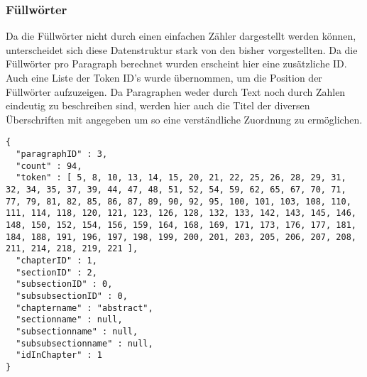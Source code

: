 \subsubsection*{F\"ullw\"orter}
Da die F\"ullw\"orter nicht durch einen einfachen Z\"ahler dargestellt werden k\"onnen, unterscheidet sich diese Datenstruktur stark von den bisher vorgestellten. Da die F\"ullw\"orter pro Paragraph berechnet wurden erscheint hier eine zus\"atzliche ID. Auch eine Liste der Token ID's wurde \"ubernommen, um die Position der F\"ullw\"orter aufzuzeigen. Da Paragraphen weder durch Text noch durch Zahlen eindeutig zu beschreiben sind, werden hier auch die Titel der diversen \"Uberschriften mit angegeben um so eine verst\"andliche Zuordnung zu erm\"oglichen. 
\newpage
\begin{lstlisting}
{
  "paragraphID" : 3,
  "count" : 94,
  "token" : [ 5, 8, 10, 13, 14, 15, 20, 21, 22, 25, 26, 28, 29, 31, 32, 34, 35, 37, 39, 44, 47, 48, 51, 52, 54, 59, 62, 65, 67, 70, 71, 77, 79, 81, 82, 85, 86, 87, 89, 90, 92, 95, 100, 101, 103, 108, 110, 111, 114, 118, 120, 121, 123, 126, 128, 132, 133, 142, 143, 145, 146, 148, 150, 152, 154, 156, 159, 164, 168, 169, 171, 173, 176, 177, 181, 184, 188, 191, 196, 197, 198, 199, 200, 201, 203, 205, 206, 207, 208, 211, 214, 218, 219, 221 ],
  "chapterID" : 1,
  "sectionID" : 2,
  "subsectionID" : 0,
  "subsubsectionID" : 0,
  "chaptername" : "abstract",
  "sectionname" : null,
  "subsectionname" : null,
  "subsubsectionname" : null,
  "idInChapter" : 1
}
\end{lstlisting}